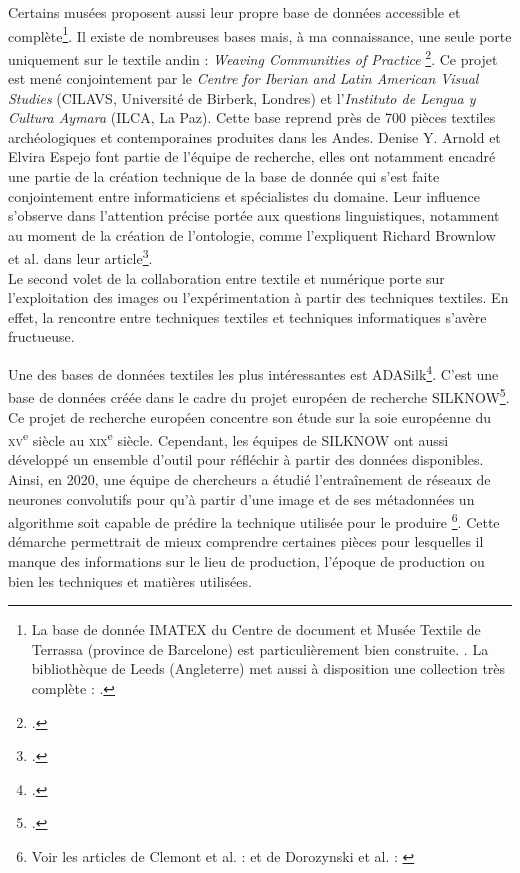 \documentclass[a4paper, twoside, 12pt]{book}
\newcommand{\siecle}[1]{\textsc{#1}\textsuperscript{e} siècle}
\begin{document}
Certains musées proposent aussi leur propre base de données accessible et complète\footnote{La base de donnée IMATEX du Centre de document et Musée Textile de Terrassa (province de Barcelone) est particulièrement bien construite. \cite{Imatex}. La bibliothèque de Leeds (Angleterre) met aussi à disposition une collection très complète : \cite{InternationalTextileCollection}.}. Il existe de nombreuses bases mais, à ma connaissance, une seule porte uniquement sur le textile andin : \og \textit{Weaving Communities of Practice} \fg\footcite{weaving}. Ce projet est mené conjointement par le \textit{Centre for Iberian and Latin American Visual Studies} (CILAVS, Université de Birberk, Londres) et l'\textit{Instituto de Lengua y Cultura Aymara} (ILCA, La Paz). Cette base reprend près de 700 pièces textiles archéologiques et contemporaines produites dans les Andes. Denise Y. Arnold et Elvira Espejo font partie de l'équipe de recherche, elles ont notamment encadré une partie de la création technique de la base de donnée qui s'est faite conjointement entre informaticiens et spécialistes du domaine. Leur influence s'observe dans l'attention précise portée aux questions linguistiques, notamment au moment de la création de l'ontologie, comme l'expliquent Richard Brownlow et al. dans leur article\footcite{brownlowOntologicalApproachCreating2015}.\\

Le second volet de la collaboration entre textile et numérique porte sur l'exploitation des images ou l'expérimentation à partir des techniques textiles. En effet, la rencontre entre techniques textiles et techniques informatiques s'avère fructueuse.

Une des bases de données textiles les plus intéressantes est ADASilk\footcite{AccueilADASilk}. C'est une base de données créée dans le cadre du projet européen de recherche \textsc{SILKNOW}\footcite{SILKNOWSILKa}. Ce projet de recherche européen concentre son étude sur la soie européenne du \siecle{xv} au \siecle{xix}. Cependant, les équipes de \textsc{SILKNOW} ont aussi développé un ensemble d'outil pour réfléchir à partir des données disponibles. Ainsi, en 2020, une équipe de chercheurs a étudié l'entraînement de réseaux de neurones convolutifs pour qu'à partir d'une image et de ses métadonnées un algorithme soit capable de prédire la technique utilisée pour le produire \footnote{Voir les articles de Clemont et al. : \cite{clermontAssessingSemanticSimilarity2020} et de Dorozynski et al. : \cite{dorozynskiMultiTaskDeepLearning2019}}. Cette démarche permettrait de mieux comprendre certaines pièces pour lesquelles il manque des informations sur le lieu de production, l'époque de production ou bien les techniques et matières utilisées.
\end{document}
